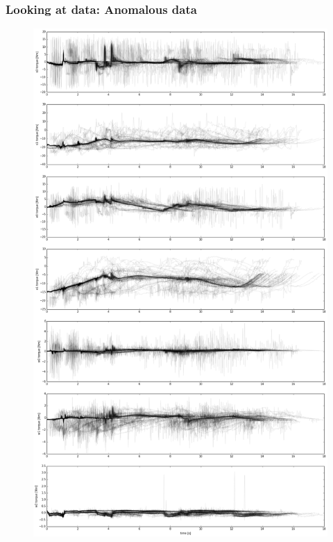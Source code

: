 \documentclass[%
USenglish,%
pdftex,%
compress,%
10pt,%
svgnames%
,handout
]
{beamer}
\begin{document}
\begin{frame}
    \frametitle{Looking at data: Anomalous data}
    \begin{figure}
        \centering
        \includegraphics[width=\datawidth]{figs/controller_broke3.png}
    \end{figure}
\end{frame}
\end{document}
